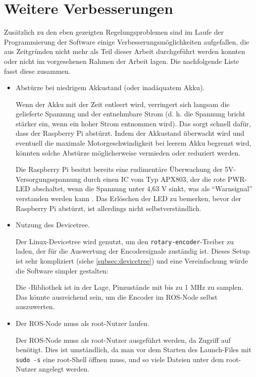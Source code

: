 \documentclass[german]{thesis_KBS}
\newcommand{\code}[1]{\texttt{#1}}  %
\begin{document}
\section{Weitere Verbesserungen}

Zusätzlich zu den eben gezeigten Regelungsproblemen sind im Laufe der
Programmierung der Software einige Verbesserungsmöglichkeiten aufgefallen, die
aus Zeitgründen nicht mehr als Teil dieser Arbeit durchgeführt werden konnten
oder nicht im vorgesehenen Rahmen der Arbeit lagen. Die nachfolgende Liste fasst
diese zusammen.

\begin{itemize}
    \item Abstürze bei niedrigem Akkustand (oder inadäquatem Akku).

    Wenn der Akku mit der Zeit entleert wird, verringert sich langsam die
    gelieferte Spannung und der entnehmbare Strom (d. h. die Spannung bricht
    stärker ein, wenn ein hoher Strom entnommen wird). Das sorgt schnell dafür,
    dass der Raspberry Pi abstürzt. Indem der Akkustand überwacht wird und
    eventuell die maximale Motorgeschwindigkeit bei leerem Akku begrenzt wird,
    könnten solche Abstürze möglicherweise vermieden oder reduziert werden.

    Die Raspberry Pi besitzt bereits eine rudimentäre Überwachung der
    5V-Versorgungsspannung durch einen IC vom Typ APX803, der die rote PWR-LED
    abschaltet, wenn die Spannung unter 4,63 V sinkt, was als "`Warnsignal"'
    verstanden werden kann \cite{raspi-schematics} \cite{apx803}. Das Erlöschen
    der LED zu bemerken, bevor der Raspberry Pi abstürzt, ist allerdings nicht
    selbstverständlich.

    \item Nutzung des Devicetree.

    Der Linux-Devicetree wird genutzt, um den \code{rotary-encoder}-Treiber zu
    laden, der für die Auswertung der Encodersignale zuständig ist. Dieses Setup
    ist sehr kompliziert (siehe \autoref{subsec:devicetree}) und eine
    Vereinfachung würde die Software simpler gestalten:

    Die \pigpio{}-Bibliothek ist in der Lage, Pinzustände mit bis zu 1 MHz zu
    samplen. Das könnte ausreichend sein, um die Encoder im ROS-Node selbst
    auszuwerten.

    \item Der ROS-Node muss als root-Nutzer laufen.

    Der ROS-Node muss als root-Nutzer ausgeführt werden, da \pigpio{} Zugriff
    auf  benötigt. Dies ist umständlich, da man vor dem Starten
    des Launch-Files mit \code{sudo -s} eine root-Shell öffnen muss, und so
    viele Dateien unter dem root-Nutzer angelegt werden.


\end{itemize}
\end{document}
